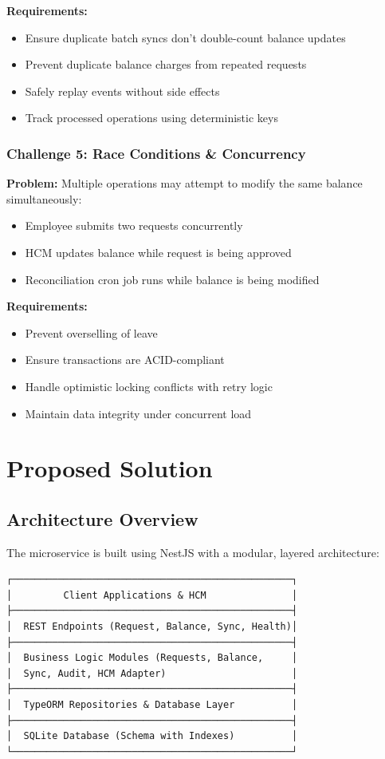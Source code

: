 \documentclass[12pt,a4paper]{article}
\begin{document}
\textbf{Requirements:}
\begin{itemize}
    \item Ensure duplicate batch syncs don't double-count balance updates
    \item Prevent duplicate balance charges from repeated requests
    \item Safely replay events without side effects
    \item Track processed operations using deterministic keys
\end{itemize}

\subsubsection{Challenge 5: Race Conditions \& Concurrency}

\textbf{Problem:} Multiple operations may attempt to modify the same balance simultaneously:
\begin{itemize}
    \item Employee submits two requests concurrently
    \item HCM updates balance while request is being approved
    \item Reconciliation cron job runs while balance is being modified
\end{itemize}

\textbf{Requirements:}
\begin{itemize}
    \item Prevent overselling of leave
    \item Ensure transactions are ACID-compliant
    \item Handle optimistic locking conflicts with retry logic
    \item Maintain data integrity under concurrent load
\end{itemize}

\newpage

\section{Proposed Solution}

\subsection{Architecture Overview}

The microservice is built using NestJS with a modular, layered architecture:

\begin{verbatim}
┌─────────────────────────────────────────────────┐
│         Client Applications & HCM               │
├─────────────────────────────────────────────────┤
│  REST Endpoints (Request, Balance, Sync, Health)│
├─────────────────────────────────────────────────┤
│  Business Logic Modules (Requests, Balance,     │
│  Sync, Audit, HCM Adapter)                      │
├─────────────────────────────────────────────────┤
│  TypeORM Repositories & Database Layer          │
├─────────────────────────────────────────────────┤
│  SQLite Database (Schema with Indexes)          │
└─────────────────────────────────────────────────┘
\end{verbatim}
\end{document}
